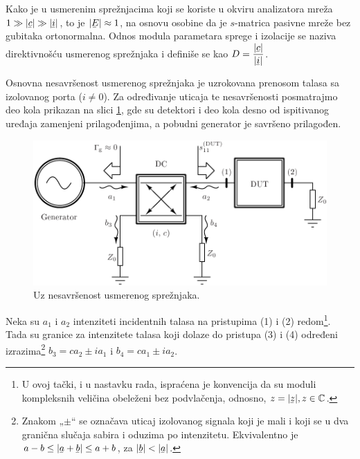 \documentclass[a4paper, 12pt, diplomski]{etf}
\newcommand{\unit}[1]{\,{\rm #1}}
\newcommand{\faz}[1]{\underaccent{\bar}{#1}}
\begin{document}
%
Kako je u 
usmerenim sprežnjacima koji se koriste u okviru analizatora mreža
$1 \gg |\faz c| \gg |\faz i|$, to je 
$|\faz E| \approx 1$, na osnovu osobine da je $s$-matrica pasivne mreže bez gubitaka ortonormalna. 
Odnos modula parametara 
sprege i izolacije se naziva direktivnošću usmerenog
sprežnjaka i definiše se kao $D = \dfrac{|\faz c|}{|\faz i|}$.



Osnovna nesavršenost usmerenog sprežnjaka
je uzrokovana prenosom talasa 
sa izolovanog porta ($i\neq 0$).
Za određivanje uticaja te nesavršenosti 
posmatrajmo deo kola prikazan na slici
\ref{fig:dc_imp}, gde su detektori 
i deo kola desno od ispitivanog uređaja
zamenjeni prilagođenjima, a pobudni 
generator je savršeno prilagođen.
%
\begin{figure}[t!]
    \centering
    \includegraphics{fig/dc_imperf.pdf}
    \caption{Uz nesavršenost usmerenog
    sprežnjaka.}
    \label{fig:dc_imp}
\end{figure}
%
Neka su 
$a_1$ i $a_2$
intenziteti incidentnih talasa na pristupima (1) i (2) 
redom\footnote{
U ovoj tački, i u nastavku rada, ispraćena je konvencija
da su moduli kompleksnih veličina obeleženi 
bez podvlačenja, odnosno, 
$z = |\faz z|, z \in \mathbb C$.
}.
Tada su granice za 
intenzitete talasa koji dolaze do pristupa (3) i 
(4) određeni izrazima\footnote{
Znakom „$\pm$“ se označava uticaj
izolovanog signala koji je mali i koji se u dva granična slučaja
sabira i oduzima po intenzitetu. Ekvivalentno je 
$a - b \leq |\faz a + \faz b| \leq a + b$, za $|\faz b| < |\faz a|$.
}
$b_3 = ca_2 \pm ia_1$ i $b_4 = ca_1 \pm ia_2$.
\end{document}
